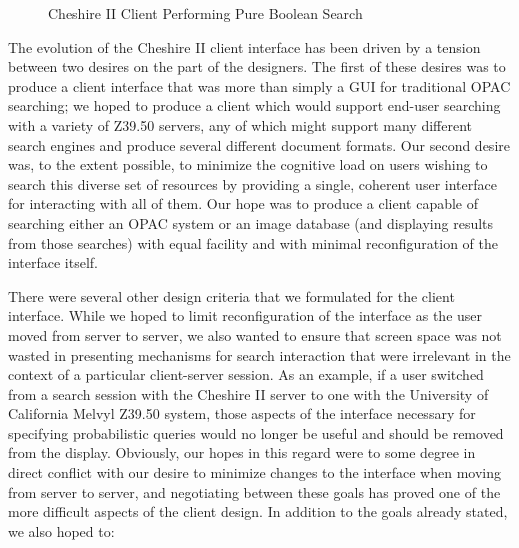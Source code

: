 \begin{figure}[t]
\begin{center}
\caption{Cheshire II Client Performing Pure Boolean Search}
\label{Boolean}
\end{center}
\end{figure}

The evolution of the Cheshire II client interface has been driven by a
tension between two desires on the part of the designers.  The first
of these desires was to produce a client interface that was more than
simply a GUI for traditional OPAC searching; we hoped to produce a
client which would support end-user searching with a variety of Z39.50
servers, any of which might support many different search engines and
produce several different document formats.  Our second desire was, to
the extent possible, to minimize the cognitive load on users wishing
to search this diverse set of resources by providing a single,
coherent user interface for interacting with all of them.  Our hope
was to produce a client capable of searching either an OPAC system or
an image database (and displaying results from those searches) with
equal facility and with minimal reconfiguration of the interface
itself.

There were several other design criteria that we formulated for the
client interface.  While we hoped to limit reconfiguration of the
interface as the user moved from server to server, we also wanted to
ensure that screen space was not wasted in presenting mechanisms for
search interaction that were irrelevant in the context of a particular
client-server session.  As an example, if a user switched from a
search session with the Cheshire II server to one with the University
of California Melvyl Z39.50 system, those aspects of the interface
necessary for specifying probabilistic queries would no longer be
useful and should be removed from the display. Obviously, our hopes in
this regard were to some degree in direct conflict with our desire to
minimize changes to the interface when moving from server to server,
and negotiating between these goals has proved one of the more
difficult aspects of the client design.  In addition to the goals
already stated, we also hoped to:

